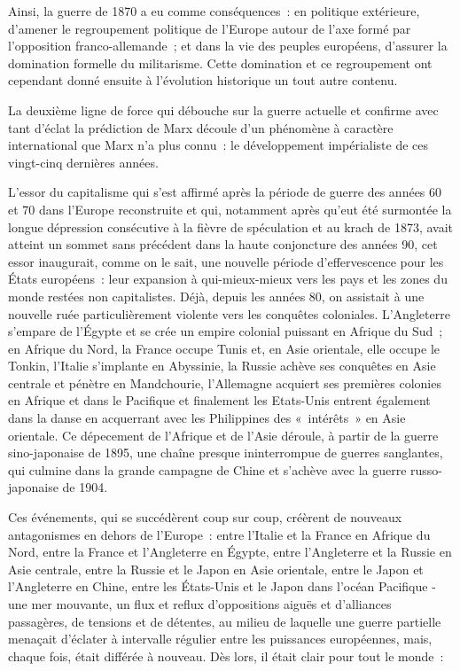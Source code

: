 \documentclass[french,twoside]{book} %
\begin{document}
Ainsi, la guerre de 1870 a eu comme conséquences : en politique extérieure, d’amener le regroupement politique de l’Europe autour de l’axe formé par l’opposition franco-allemande ; et dans la vie des peuples européens, d’assurer la domination formelle du militarisme. Cette domination et ce regroupement ont cependant donné ensuite à l’évolution historique un tout autre contenu.\par
La deuxième ligne de force qui débouche sur la guerre actuelle et confirme avec tant d’éclat la prédiction de Marx découle d’un phénomène à caractère international que Marx n’a plus connu : le développement impérialiste de ces vingt-cinq dernières années.\par
L'essor du capitalisme qui s’est affirmé après la période de guerre des années 60 et 70 dans l’Europe reconstruite et qui, notamment après qu’eut été surmontée la longue dépression consécutive à la fièvre de spéculation et au krach de 1873, avait atteint un sommet sans précédent dans la haute conjoncture des années 90, cet essor inaugurait, comme on le sait, une nouvelle période d’effervescence pour les États européens : leur expansion à qui-mieux-mieux vers les pays et les zones du monde restées non capitalistes. Déjà, depuis les années 80, on assistait à une nouvelle ruée particulièrement violente vers les conquêtes coloniales. L'Angleterre s’empare de l’Égypte et se crée un empire colonial puissant en Afrique du Sud ; en Afrique du Nord, la France occupe Tunis et, en Asie orientale, elle occupe le Tonkin, l’Italie s’implante en Abyssinie, la Russie achève ses conquêtes en Asie centrale et pénètre en Mandchourie, l’Allemagne acquiert ses premières colonies en Afrique et dans le Pacifique et finalement les Etats-Unis entrent également dans la danse en acquerrant avec les Philippines des « intérêts » en Asie orientale. Ce dépecement de l’Afrique et de l’Asie déroule, à partir de la guerre sino-japonaise de 1895, une chaîne presque ininterrompue de guerres sanglantes, qui culmine dans la grande campagne de Chine et s’achève avec la guerre russo-japonaise de 1904.\par
Ces événements, qui se succédèrent coup sur coup, créèrent de nouveaux antagonismes en dehors de l’Europe : entre l’Italie et la France en Afrique du Nord, entre la France et l’Angleterre en Égypte, entre l’Angleterre et la Russie en Asie centrale, entre la Russie et le Japon en Asie orientale, entre le Japon et l’Angleterre en Chine, entre les États-Unis et le Japon dans l’océan Pacifique - une mer mouvante, un flux et  reflux d’oppositions aiguës et d’alliances passagères, de tensions et de détentes, au milieu de laquelle une guerre partielle menaçait d’éclater à intervalle régulier entre les puissances européennes, mais, chaque fois, était différée à nouveau. Dès lors, il était clair pour tout le monde :\par
\end{document}
